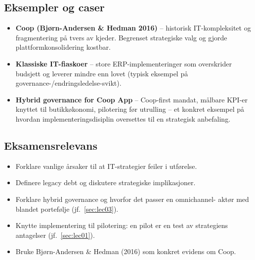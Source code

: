 \subsection{Eksempler og caser}
\begin{itemize}
  \item \textbf{Coop (Bjørn-Andersen \& Hedman 2016)} -- historisk
    IT-kompleksitet og fragmentering på tvers av kjeder. Begrenset
    strategiske valg og gjorde plattformkonsolidering kostbar.
  \item \textbf{Klassiske IT-fiaskoer} -- store ERP-implementeringer som
    overskrider budsjett og leverer mindre enn lovet (typisk eksempel
    på governance-/endringsledelse-svikt).
  \item \textbf{Hybrid governance for Coop App} -- Coop-first mandat,
    målbare KPI-er knyttet til butikkøkonomi, pilotering før utrulling --
    et konkret eksempel på hvordan implementeringsdisiplin oversettes til
    en strategisk anbefaling.
\end{itemize}

\subsection{Eksamensrelevans}
\begin{itemize}
  \item Forklare vanlige årsaker til at IT-strategier feiler i utførelse.
  \item Definere legacy debt og diskutere strategiske implikasjoner.
  \item Forklare hybrid governance og hvorfor det passer en omnichannel-
    aktør med blandet portefølje (jf.\ \autoref{sec:lec03}).
  \item Knytte implementering til pilotering: en pilot er en test av
    strategiens antagelser (jf.\ \autoref{sec:lec01}).
  \item Bruke Bjørn-Andersen \& Hedman (2016) som konkret evidens om Coop.
\end{itemize}
